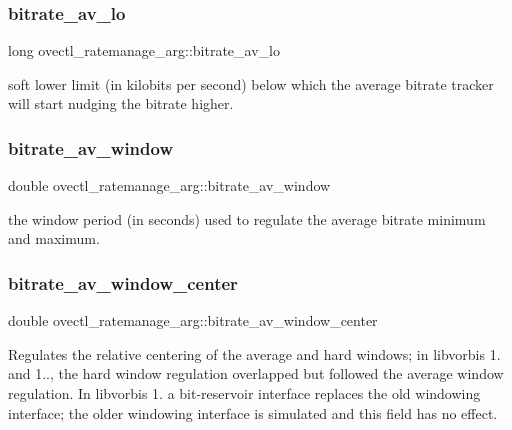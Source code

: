 \subsubsection{\texorpdfstring{bitrate\+\_\+av\+\_\+lo}{bitrate\_av\_lo}}
{\footnotesize\ttfamily long ovectl\+\_\+ratemanage\+\_\+arg\+::bitrate\+\_\+av\+\_\+lo}

soft lower limit (in kilobits per second) below which the average bitrate tracker will start nudging the bitrate higher. \mbox{\label{structovectl__ratemanage__arg_a1232e7296ae5e52f52039bed2560c505}} 
\subsubsection{\texorpdfstring{bitrate\+\_\+av\+\_\+window}{bitrate\_av\_window}}
{\footnotesize\ttfamily double ovectl\+\_\+ratemanage\+\_\+arg\+::bitrate\+\_\+av\+\_\+window}

the window period (in seconds) used to regulate the average bitrate minimum and maximum. \mbox{\label{structovectl__ratemanage__arg_aad317d50fb4d072e2c55f0a60d1a83b2}} 
\subsubsection{\texorpdfstring{bitrate\+\_\+av\+\_\+window\+\_\+center}{bitrate\_av\_window\_center}}
{\footnotesize\ttfamily double ovectl\+\_\+ratemanage\+\_\+arg\+::bitrate\+\_\+av\+\_\+window\+\_\+center}

Regulates the relative centering of the average and hard windows; in libvorbis 1. and 1.., the hard window regulation overlapped but followed the average window regulation. In libvorbis 1. a bit-\/reservoir interface replaces the old windowing interface; the older windowing interface is simulated and this field has no effect. \mbox{\label{structovectl__ratemanage__arg_a3620024b5a9e4b4df6d20deb6c125c92}} 
